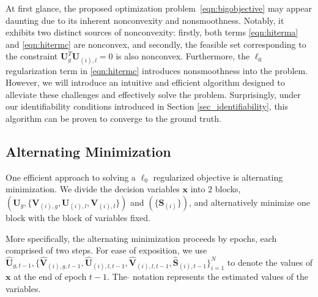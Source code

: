 \documentclass[twoside,11pt]{article}
\newcommand{\matS}{\mathbf{S}}
\newcommand{\matU}{\mathbf{U}}
\newcommand{\matV}{\mathbf{V}}
\newcommand{\hmatS}{\hat{\mathbf{S}}}
\newcommand{\hmatU}{\hat{\mathbf{U}}}
\newcommand{\hmatV}{\hat{\mathbf{V}}}
\newcommand{\vecx}{\mathbf{x}}
\begin{document}
At first glance, the proposed optimization problem~\eqref{eqn:bigobjective} may appear daunting due to its inherent nonconvexity and nonsmoothness. Notably, it exhibits two distinct sources of nonconvexity: firstly, both terms \eqref{eqn:hiterma} and \eqref{eqn:hitermc} are nonconvex, and secondly, the feasible set corresponding to the constraint $\matU_g^T\matU_{(i),l}=0$ is also nonconvex. Furthermore, the $\ell_0$ regularization term in \eqref{eqn:hitermc} introduces nonsmoothness into the problem. However, we will introduce an intuitive and efficient algorithm designed to alleviate these challenges and effectively solve the problem. Surprisingly, under our identifiability conditions introduced in Section \ref{sec_identifiability}, this algorithm can be proven to converge to the ground truth.

\subsection{Alternating Minimization}
\label{sec:altmin}
One efficient approach to solving a $\ell_0$ regularized objective is alternating minimization. We divide the decision variables $\vecx$ into $2$ blocks, $\left(\matU_g,\{\matV_{(i),g},\matU_{(i),l},\matV_{(i),l}\}\right)$ and $\left(\{\matS_{(i)}\}\right)$, and alternatively minimize one block with the block of variables fixed. 

More specifically, the alternating minimization proceeds by epochs, each comprised of two steps. For ease of exposition, we use $\hmatU_{g,t-1},\{\hmatV_{(i),g,t-1},\hmatU_{(i),l,t-1},\hmatV_{(i),l,t-1},\hmatS_{(i),t-1}\}_{i=1}^N$ to denote the values of $\vecx$ at the end of epoch $t-1$. The $\hat{}$ notation represents the estimated values of the variables. %
\end{document}
